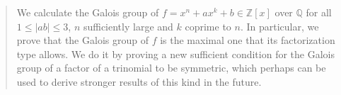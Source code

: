 \documentclass[../main.tex]{subfiles}
\begin{document}
  \begin{abstract}
    We calculate the Galois group of $f = x^n + ax^k + b \in \mathbb{Z}\left[ x \right]$ over $\mathbb{Q}$ for all $1 \leq \left| ab \right| \leq 3$, $n$ sufficiently large and $k$ coprime to $n$.
    In particular, we prove that the Galois group of $f$ is the maximal one that its factorization type allows.
    We do it by proving a new sufficient condition for the Galois group of a factor of a trinomial to be symmetric, which perhaps can be used to derive stronger results of this kind in the future.
  \end{abstract}
\end{document}
